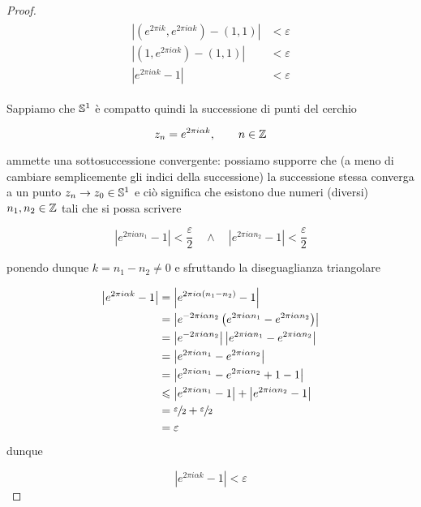 \begin{proof}
	\begin{align}
		\begin{split}
			\left| (e^{2 \pi i k}, e^{2 \pi i \alpha k}) - (1,1) \right| &< \varepsilon\\
			\left| (1, e^{2 \pi i \alpha k}) - (1,1) \right| &< \varepsilon\\
			\left| e^{2 \pi i \alpha k} - 1 \right| &< \varepsilon
		\end{split}
	\end{align}

	Sappiamo che $ \S^{1} $ è compatto quindi la successione di punti del cerchio
	
	\begin{equation}
		z_{n} = e^{2 \pi i \alpha k}, \qquad n \in \Z
	\end{equation}

	ammette una sottosuccessione convergente: possiamo supporre che (a meno di cambiare semplicemente gli indici della successione) la successione stessa converga a un punto $ z_{n} \to z_{0} \in \S^{1} $ e ciò significa che esistono due numeri (diversi) $ n_{1},n_{2} \in \Z $ tali che si possa scrivere
	
	\begin{equation}
		\left| e^{2 \pi i \alpha n_{1}} - 1 \right| < \dfrac{\varepsilon}{2} \quad \wedge \quad \left| e^{2 \pi i \alpha n_{2}} - 1 \right| < \dfrac{\varepsilon}{2}
	\end{equation}

	ponendo dunque $ k = n_{1} - n_{2} \neq 0 $ e sfruttando la diseguaglianza triangolare
	
	\begin{align}
		\begin{split}
			\left| e^{2 \pi i \alpha k} - 1 \right| &= \left| e^{2 \pi i \alpha (n_{1} - n_{2})} - 1 \right|\\
			&= \left| e^{ -2 \pi i \alpha n_{2}} \left( e^{2 \pi i \alpha n_{1}} - e^{2 \pi i \alpha n_{2}} \right) \right|\\
			&= \left| e^{ -2 \pi i \alpha n_{2}} \right| \left| e^{2 \pi i \alpha n_{1}} - e^{2 \pi i \alpha n_{2}} \right|\\
			&= \left| e^{2 \pi i \alpha n_{1}} - e^{2 \pi i \alpha n_{2}} \right|\\
			&= \left| e^{2 \pi i \alpha n_{1}} - e^{2 \pi i \alpha n_{2}} +1 -1 \right|\\
			&\leqslant \left| e^{2 \pi i \alpha n_{1}} - 1 \right| + \left| e^{2 \pi i \alpha n_{2}} - 1 \right|\\
			&= \sfrac{\varepsilon}{2} + \sfrac{\varepsilon}{2}\\
			&= \varepsilon
		\end{split}
	\end{align}

	dunque
	
	\begin{equation}
		\left| e^{2 \pi i \alpha k} - 1 \right| < \varepsilon
	\end{equation}
\end{proof}

